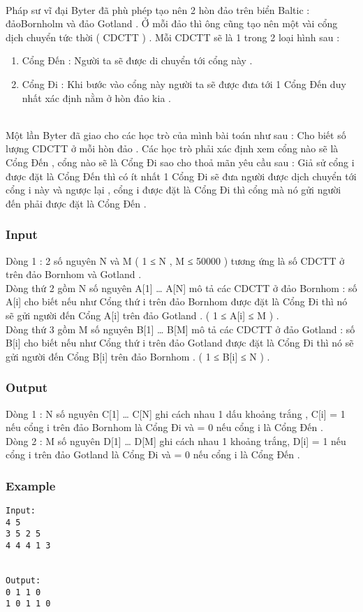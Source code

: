 

 

Pháp sư vĩ đại Byter đã phù phép tạo nên 2 hòn đảo trên biển Baltic : đảoBornholm và đảo Gotland . Ở mỗi đảo thì ông cũng tạo nên một vài cổng dịch chuyển tức thời ( CDCTT ) . Mỗi CDCTT sẽ là 1 trong 2 loại hình sau :
\begin{enumerate}
	\item Cổng Đến : Người ta sẽ được di chuyển tới cổng này .
	\item Cổng Đi : Khi bước vào cổng này người ta sẽ được đưa tới 1 Cổng Đến duy nhất xác định nằm ở hòn đảo kia .
\end{enumerate}


\\Một lần Byter đã giao cho các học trò của mình bài toán như sau : Cho biết số lượng CDCTT ở mỗi hòn đảo . Các học trò phải xác định xem cổng nào sẽ là Cổng Đến , cổng nào sẽ là Cổng Đi sao cho thoả mãn yêu cầu sau : Giả sử cổng i được đặt là Cổng Đến thì có ít nhất 1 Cổng Đi sẽ đưa người được dịch chuyển tới cổng i này và ngược lại , cổng i được đặt là Cổng Đi thì cổng mà nó gửi người đến phải được đặt là Cổng Đến .

\subsubsection{Input}

Dòng 1 : 2 số nguyên N và M ( 1 ≤ N , M ≤ 50000 ) tương ứng là số CDCTT ở trên đảo Bornhom và Gotland .
\\Dòng thứ 2 gồm N số nguyên A[1] … A[N] mô tả các CDCTT ở đảo Bornhom : số A[i] cho biết nếu như Cổng thứ i trên đảo Bornhom được đặt là Cổng Đi thì nó sẽ gửi người đến Cổng A[i] trên đảo Gotland . ( 1 ≤ A[i] ≤ M ) .
\\Dòng thứ 3 gồm M số nguyên B[1] … B[M] mô tả các CDCTT ở đảo Gotland : số B[i] cho biết nếu như Cổng thứ i trên đảo Gotland được đặt là Cổng Đi thì nó sẽ gửi người đến Cổng B[i] trên đảo Bornhom . ( 1 ≤ B[i] ≤ N ) .

\subsubsection{Output}

Dòng 1 : N số nguyên C[1] … C[N] ghi cách nhau 1 dấu khoảng trắng , C[i] = 1 nếu cổng i trên đảo Bornhom là Cổng Đi và = 0 nếu cổng i là Cổng Đến .
\\Dòng 2 : M số nguyên D[1] … D[M] ghi cách nhau 1 khoảng trắng, D[i] = 1 nếu cổng i trên đảo Gotland là Cổng Đi và = 0 nếu cổng i là Cổng Đến .

\subsubsection{Example}
\begin{verbatim}
Input:
4 5
3 5 2 5
4 4 4 1 3


Output:
0 1 1 0
1 0 1 1 0

\end{verbatim}
